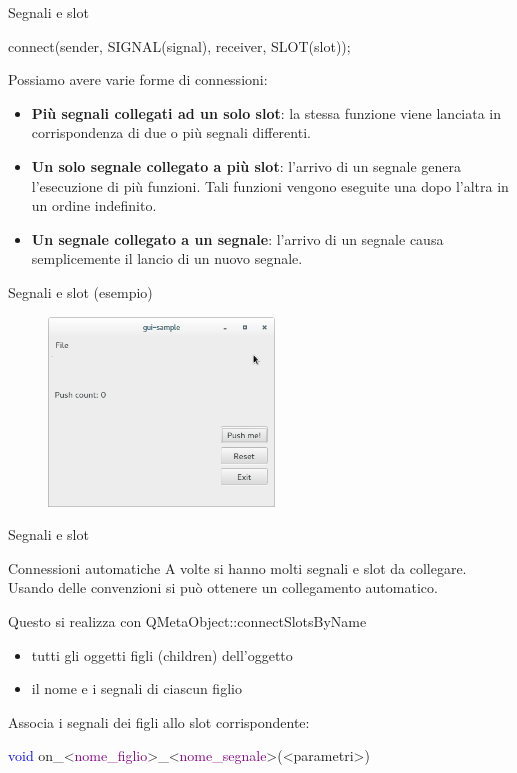 \documentclass{beamer}
\begin{document}
\begin{frame}{Segnali e slot}
	\begin{block}{}
		\begin{center}
			{\ttfamily connect(sender, SIGNAL(signal), receiver, SLOT(slot));}
		\end{center}
	\end{block}
	\bigskip
	Possiamo avere varie forme di connessioni:
	\begin{itemize}
		\item \textbf{Più segnali collegati ad un solo slot}: la stessa funzione viene lanciata in corrispondenza di due o più segnali differenti.
		\item \textbf{Un solo segnale collegato a più slot}: l'arrivo di un segnale genera l'esecuzione di più funzioni. Tali funzioni vengono eseguite una dopo l'altra in un ordine indefinito.
		\item \textbf{Un segnale collegato a un segnale}: l'arrivo di un segnale causa semplicemente il lancio di un nuovo segnale.
	\end{itemize}
\end{frame}

\begin{frame}{Segnali e slot (esempio)}
	\begin{figure}
		\includegraphics[width=6cm]{images/gui-sample.png}
	\end{figure}
\end{frame}

\begin{frame}{Segnali e slot}
	\begin{block}{Connessioni automatiche}
		A volte si hanno molti segnali e slot da collegare. Usando delle convenzioni si può ottenere un collegamento automatico. 
		
		Questo si realizza con {\ttfamily QMetaObject::connectSlotsByName}
		\begin{itemize}
			\item tutti gli oggetti figli (children) dell'oggetto
			\item il nome e i segnali di ciascun figlio
		\end{itemize}
		
		\bigskip
		Associa i segnali dei figli allo slot corrispondente:
		
		\bigskip
		\centering
		{\ttfamily \textcolor{blue}{void} on\_<\textcolor{purple}{nome\_figlio}>\_<\textcolor{purple}{nome\_segnale}>(<parametri>)}
	\end{block}
\end{frame}
\end{document}
